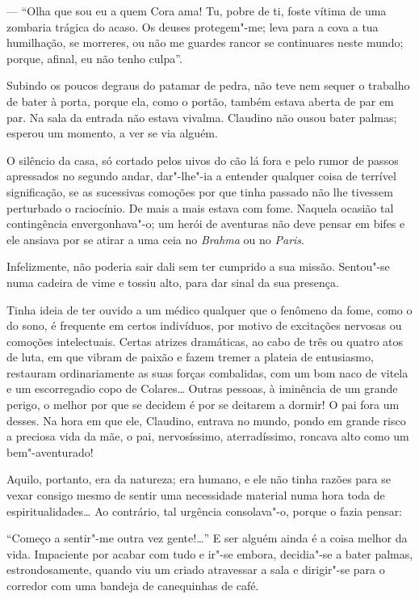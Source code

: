 --- ``Olha que sou eu a quem Cora ama! Tu, pobre de ti, foste vítima de
uma zombaria trágica do acaso. Os deuses protegem"-me; leva para a cova a
tua humilhação, se morreres, ou não me guardes rancor se continuares
neste mundo; porque, afinal, eu não tenho culpa''.

Subindo os poucos degraus do patamar de pedra, não teve nem sequer o
trabalho de bater à porta, porque ela, como o portão, também estava
aberta de par em par. Na sala da entrada não estava vivalma. Claudino
não ousou bater palmas; esperou um momento, a ver se via alguém.

O silêncio da casa, só cortado pelos uivos do cão lá fora e pelo rumor
de passos apressados no segundo andar, dar"-lhe"-ia a entender qualquer
coisa de terrível significação, se as sucessivas comoções por que tinha
passado não lhe tivessem perturbado o raciocínio. De mais a mais estava
com fome. Naquela ocasião tal contingência envergonhava"-o; um herói de
aventuras não deve pensar em bifes e ele ansiava por se atirar a uma
ceia no \emph{Brahma} ou no \emph{Paris}.

Infelizmente, não poderia sair dali sem ter cumprido a sua missão.
Sentou"-se numa cadeira de vime e tossiu alto, para dar sinal da sua
presença.

Tinha ideia de ter ouvido a um médico qualquer que o fenômeno da fome,
como o do sono, é frequente em certos indivíduos, por motivo de
excitações nervosas ou comoções intelectuais. Certas atrizes dramáticas,
ao cabo de três ou quatro atos de luta, em que vibram de paixão e fazem
tremer a plateia de entusiasmo, restauram ordinariamente as suas forças
combalidas, com um bom naco de vitela e um escorregadio copo de
Colares\ldots{} Outras pessoas, à iminência de um grande perigo, o melhor por
que se decidem é por se deitarem a dormir! O pai fora um desses. Na hora
em que ele, Claudino, entrava no mundo, pondo em grande risco a preciosa
vida da mãe, o pai, nervosíssimo, aterradíssimo, roncava alto como um
bem"-aventurado!

Aquilo, portanto, era da natureza; era humano, e ele não tinha razões
para se vexar consigo mesmo de sentir uma necessidade material numa hora
toda de espiritualidades\ldots{} Ao contrário, tal urgência consolava"-o,
porque o fazia pensar:

``Começo a sentir"-me outra vez gente!\ldots{}'' E ser alguém ainda é a coisa
melhor da vida. Impaciente por acabar com tudo e ir"-se embora,
decidia"-se a bater palmas, estrondosamente, quando viu um criado
atravessar a sala e dirigir"-se para o corredor com uma bandeja de
canequinhas de café.

